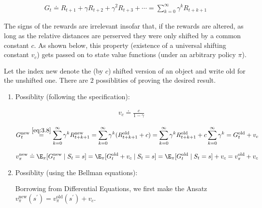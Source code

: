\begin{solution}

\begin{align} \label{eq:3.8} \tag{3.8}
    G_t
    \doteq
    R_{t+1} + \gamma R_{t+2} + \gamma^2 R_{t+3} + \cdots
    =
    \sum_{k=0}^\infty
        \gamma^k R_{t+k+1}
\end{align}

The signs of the rewards are irrelevant insofar that, if the rewards are altered, as long as the relative distances are perserved they were only shifted by a common constant $c$.
As shown below, this property (existence of a universal shifting constant $v_c$) gets passed on to state value functions (under an arbitrary policy $\pi$).

Let the index $\text{new}$ denote the (by $c$) shifted version of an object and write $\text{old}$ for the unshifted one.
There are $2$ possiblities of proving the desired result.

\begin{enumerate}[label = \arabic*.]

    \item Possiblity (following the specification):
    
    \begin{align*}
        v_c \doteq \frac{c}{1 - \gamma}
    \end{align*}
    
    \begin{align*}
        G_t^\text{new}
        \stackrel
        {
            \eqref{eq:3.8}
        }{=}
        \sum_{k=0}^\infty
            \gamma^k R_{t+k+1}^\text{new}
        =
        \sum_{k=0}^\infty
            \gamma^k (R_{t+k+1}^\text{old} + c)
        =
        \sum_{k=0}^\infty
            \gamma^k R_{t+k+1}^\text{old}
        +
        c
        \sum_{k=0}^\infty
            \gamma^k
        =
        G_t^\text{old} + v_c
    \end{align*}

    \begin{align*}
        v_\pi^\text{new}
        \doteq
        \E_\pi[G_t^\text{new} \mid S_t = s]
        =
        \E_\pi[G_t^\text{old} + v_c \mid S_t = s]
        =
        \E_\pi[G_t^\text{old} \mid S_t = s] + v_c
        =
        v_\pi^\text{old} + v_c
    \end{align*}

    \item Possiblity (using the Bellman equations):
    
    Borrowing from Differential Equations, we first make the Ansatz $v_\pi^\text{new}(s^\prime) = v_\pi^\text{old}(s^\prime) + v_c$.


\end{enumerate}
\end{solution}
